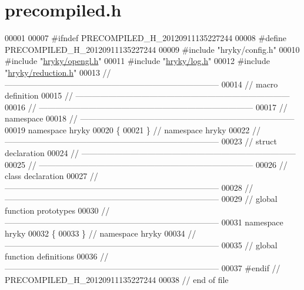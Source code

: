 \hypertarget{opengl_2src_2precompiled_8h_source}{\section{precompiled.\-h}
}

\begin{DoxyCode}
00001 
00007 \textcolor{preprocessor}{#ifndef PRECOMPILED\_H\_20120911135227244}
00008 \textcolor{preprocessor}{}\textcolor{preprocessor}{#define PRECOMPILED\_H\_20120911135227244}
00009 \textcolor{preprocessor}{}\textcolor{preprocessor}{#include "hryky/config.h"}
00010 \textcolor{preprocessor}{#include "\hyperlink{opengl_8h}{hryky/opengl.h}"}
00011 \textcolor{preprocessor}{#include "\hyperlink{log_8h}{hryky/log.h}"}
00012 \textcolor{preprocessor}{#include "\hyperlink{reduction_8h}{hryky/reduction.h}"}
00013 \textcolor{comment}{//
      ------------------------------------------------------------------------------}
00014 \textcolor{comment}{// macro definition}
00015 \textcolor{comment}{//
      ------------------------------------------------------------------------------}
00016 \textcolor{comment}{//
      ------------------------------------------------------------------------------}
00017 \textcolor{comment}{// namespace}
00018 \textcolor{comment}{//
      ------------------------------------------------------------------------------}
00019 \textcolor{keyword}{namespace }hryky
00020 \{
00021 \} \textcolor{comment}{// namespace hryky}
00022 \textcolor{comment}{//
      ------------------------------------------------------------------------------}
00023 \textcolor{comment}{// struct declaration}
00024 \textcolor{comment}{//
      ------------------------------------------------------------------------------}
00025 \textcolor{comment}{//
      ------------------------------------------------------------------------------}
00026 \textcolor{comment}{// class declaration}
00027 \textcolor{comment}{//
      ------------------------------------------------------------------------------}
00028 \textcolor{comment}{//
      ------------------------------------------------------------------------------}
00029 \textcolor{comment}{// global function prototypes}
00030 \textcolor{comment}{//
      ------------------------------------------------------------------------------}
00031 \textcolor{keyword}{namespace }hryky
00032 \{
00033 \} \textcolor{comment}{// namespace hryky}
00034 \textcolor{comment}{//
      ------------------------------------------------------------------------------}
00035 \textcolor{comment}{// global function definitions}
00036 \textcolor{comment}{//
      ------------------------------------------------------------------------------}
00037 \textcolor{preprocessor}{#endif // PRECOMPILED\_H\_20120911135227244}
00038 \textcolor{preprocessor}{}\textcolor{comment}{// end of file}
\end{DoxyCode}
